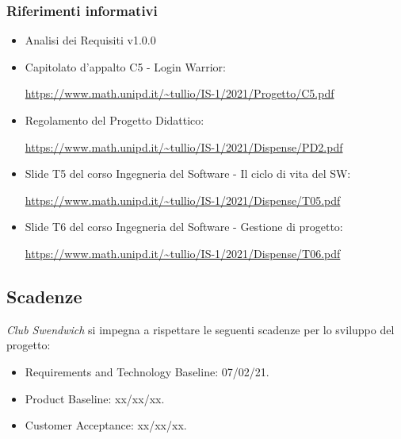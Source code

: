\subsubsection{Riferimenti informativi}
\begin{itemize}
    \item Analisi dei Requisiti v1.0.0
    \item Capitolato d'appalto C5 - Login Warrior: \par \url{https://www.math.unipd.it/~tullio/IS-1/2021/Progetto/C5.pdf}
    \item Regolamento del Progetto Didattico: \par \url{https://www.math.unipd.it/~tullio/IS-1/2021/Dispense/PD2.pdf}
    \item Slide T5 del corso Ingegneria del Software - Il ciclo di vita del SW: \par \url{https://www.math.unipd.it/~tullio/IS-1/2021/Dispense/T05.pdf}
    \item Slide T6 del corso Ingegneria del Software - Gestione di progetto: \par \url{https://www.math.unipd.it/~tullio/IS-1/2021/Dispense/T06.pdf}
\end{itemize}

\subsection{Scadenze}
\textit{Club Swendwich} si impegna a rispettare le seguenti scadenze per lo sviluppo del progetto:
\begin{itemize}
    \item Requirements and Technology Baseline: 07/02/21.
    \item Product Baseline: xx/xx/xx.
    \item Customer Acceptance: xx/xx/xx.
\end{itemize}
